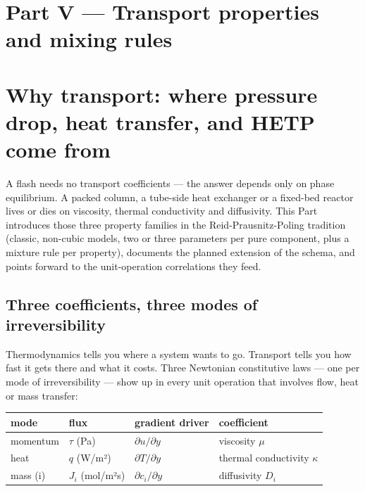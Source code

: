 \documentclass[11pt,a4paper]{article}
\begin{document}
\section*{Part V --- Transport properties and mixing rules}
{}

\setcounter{section}{0}

\section{Why transport: where pressure drop, heat transfer, and HETP come from}\label{ch:why-transport}

\begin{whatyoulllearn}
A flash needs no transport coefficients --- the answer depends only
on phase equilibrium.  A packed column, a tube-side heat exchanger
or a fixed-bed reactor lives or dies on viscosity, thermal
conductivity and diffusivity.  This Part introduces those three
property families in the Reid-Prausnitz-Poling tradition (classic,
non-cubic models, two or three parameters per pure component, plus a
mixture rule per property), documents the planned extension of the
 schema, and points forward to the unit-operation
correlations they feed.
\end{whatyoulllearn}

\subsection{Three coefficients, three modes of irreversibility}

Thermodynamics tells you where a system wants to go.  Transport tells
you how fast it gets there and what it costs.  Three Newtonian
constitutive laws --- one per mode of irreversibility --- show up in
every unit operation that involves flow, heat or mass transfer:

\begin{center}\small
\begin{tabular}{@{}llll@{}}
\toprule
mode      & flux            & gradient driver       & coefficient \\
\midrule
momentum  & $\tau$ (Pa)     & $\partial u / \partial y$ & viscosity $\mu$ \\
heat      & $q$ (W/m²)      & $\partial T / \partial y$ & thermal conductivity $\kappa$ \\
mass (i)  & $J_i$ (mol/m²s) & $\partial c_i / \partial y$ & diffusivity $D_i$ \\
\bottomrule
\end{tabular}
\end{center}
\end{document}
